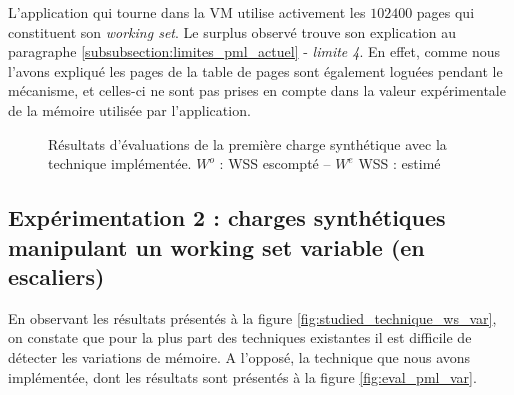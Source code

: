 L'application qui tourne dans la VM utilise activement les $102400$ pages qui constituent son \emph{working set}. Le surplus observé trouve son explication au paragraphe \ref{subsubsection:limites_pml_actuel} - \textit{limite 4}. En effet, comme nous l'avons expliqué les pages de la table de pages sont également loguées pendant le mécanisme, et celles-ci ne sont pas prises en compte dans la valeur expérimentale de la mémoire utilisée par l'application.

\begin{figure}[H]
  \centering  
  \scriptsize
\caption{Résultats d'évaluations de la première charge synthétique avec la technique implémentée. $W^o$ : WSS escompté -- $W^e$ WSS : estimé}
\label{fig:eval_pml_cst}
\end{figure}

\subsection{Expérimentation 2 : charges synthétiques manipulant un working set variable (en escaliers)}
En observant les résultats présentés à la figure \ref{fig:studied_technique_ws_var}, on constate que pour la plus part des techniques existantes il est difficile de détecter les variations de mémoire. A l'opposé, la technique que nous avons implémentée, dont les résultats sont présentés à la figure \ref{fig:eval_pml_var}.\\
\par

